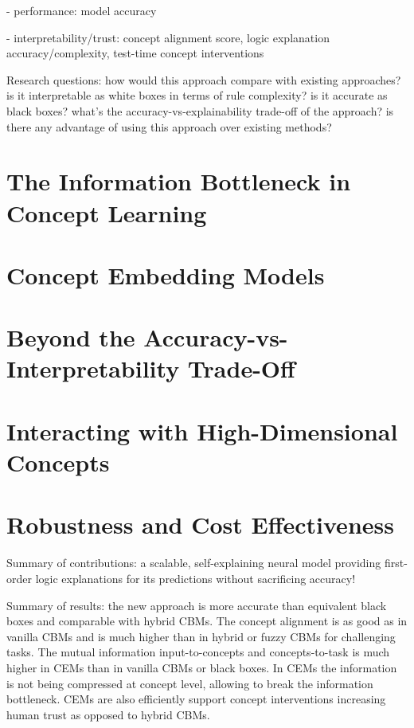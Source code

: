\documentclass[withindex,glossary]{cam-thesis}
\begin{document}
- performance: model accuracy

- interpretability/trust: concept alignment score, logic explanation accuracy/complexity, test-time concept interventions

Research questions: how would this approach compare with existing approaches? is it interpretable as white boxes in terms of rule complexity? is it accurate as black boxes? what's the accuracy-vs-explainability trade-off of the approach? is there any advantage of using this approach over existing methods?

\section{The Information Bottleneck in Concept Learning}

\section{Concept Embedding Models}

\section{Beyond the Accuracy-vs-Interpretability Trade-Off}

\section{Interacting with High-Dimensional Concepts}

\section{Robustness and Cost Effectiveness}

Summary of contributions: a scalable, self-explaining neural model providing first-order logic explanations for its predictions without sacrificing accuracy!

Summary of results: the new approach is more accurate than equivalent black boxes and comparable with hybrid CBMs. The concept alignment is as good as in vanilla CBMs and is much higher than in hybrid or fuzzy CBMs for challenging tasks. The mutual information input-to-concepts and concepts-to-task is much higher in CEMs than in vanilla CBMs or black boxes. In CEMs the information is not being compressed at concept level, allowing to break the information bottleneck. CEMs are also efficiently support concept interventions increasing human trust as opposed to hybrid CBMs.
\end{document}
